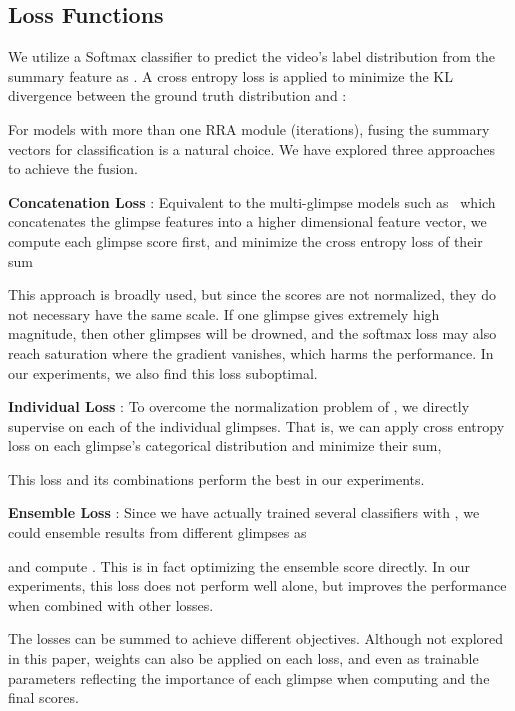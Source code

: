 \documentclass[runningheads]{llncs}
\begin{document}
\subsection{Loss Functions}\label{sec:loss}
We utilize a Softmax classifier to predict the video's label distribution  from the summary feature  as . A cross entropy loss is applied to minimize the KL divergence between the ground truth distribution  and :

For models with more than one RRA module (iterations), fusing the summary vectors for classification is a natural choice. We have explored three approaches to achieve the fusion.

\textbf{Concatenation Loss }: Equivalent to the multi-glimpse models such as~\cite{fukui2016multimodal} which concatenates the glimpse features into a higher dimensional feature vector, we compute each glimpse score  first, and minimize the cross entropy loss  of their sum

This approach is broadly used, but since the scores are not normalized, they do not necessary have the same scale. If one glimpse gives extremely high magnitude, then other glimpses will be drowned, and the softmax loss may also reach saturation where the gradient vanishes, which harms the performance. In our experiments, we also find this loss suboptimal.

\textbf{Individual Loss }: To overcome the normalization problem of , we directly supervise on each of the individual glimpses. That is, we can apply cross entropy loss on each glimpse's categorical distribution  and minimize their sum,

This loss and its combinations perform the best in our experiments.

\textbf{Ensemble Loss }: Since we have actually trained several classifiers with , we could ensemble results from different glimpses as

and compute .
This is in fact optimizing the ensemble score directly. In our experiments, this loss does not perform well alone, but improves the performance when combined with other losses. 

The losses can be summed to achieve different objectives. Although not explored in this paper, weights can also be applied on each loss, and even as trainable parameters reflecting the importance of each glimpse when computing  and the final scores.
\end{document}
